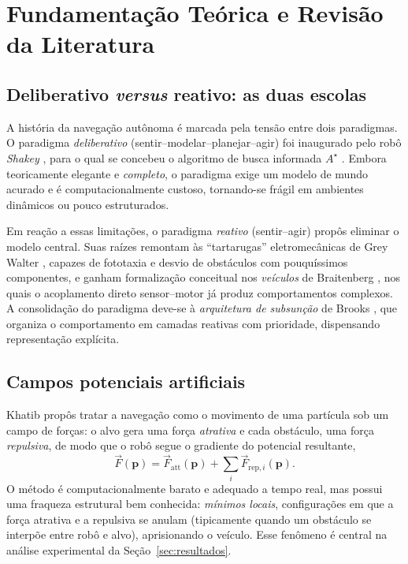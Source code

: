 \documentclass[11pt,a4paper]{article}
\begin{document}
\section{Fundamentação Teórica e Revisão da Literatura}\label{sec:fund}

\subsection{Deliberativo \emph{versus} reativo: as duas escolas}
A história da navegação autônoma é marcada pela tensão entre dois paradigmas. O paradigma \emph{deliberativo} (sentir--modelar--planejar--agir) foi inaugurado pelo robô \emph{Shakey} \cite{nilsson1984shakey}, para o qual se concebeu o algoritmo de busca informada $A^\star$ \cite{hart1968astar}. Embora teoricamente elegante e \emph{completo}, o paradigma exige um modelo de mundo acurado e é computacionalmente custoso, tornando-se frágil em ambientes dinâmicos ou pouco estruturados.

Em reação a essas limitações, o paradigma \emph{reativo} (sentir--agir) propôs eliminar o modelo central. Suas raízes remontam às ``tartarugas'' eletromecânicas de Grey Walter \cite{walter1950}, capazes de fototaxia e desvio de obstáculos com pouquíssimos componentes, e ganham formalização conceitual nos \emph{veículos} de Braitenberg \cite{braitenberg1984}, nos quais o acoplamento direto sensor--motor já produz comportamentos complexos. A consolidação do paradigma deve-se à \emph{arquitetura de subsunção} de Brooks \cite{brooks1986,brooks1991}, que organiza o comportamento em camadas reativas com prioridade, dispensando representação explícita.

\subsection{Campos potenciais artificiais}
Khatib \cite{khatib1986} propôs tratar a navegação como o movimento de uma partícula sob um campo de forças: o alvo gera uma força \emph{atrativa} e cada obstáculo, uma força \emph{repulsiva}, de modo que o robô segue o gradiente do potencial resultante,
\begin{equation}
  \vec{F}(\mathbf{p}) = \vec{F}_{\text{att}}(\mathbf{p}) + \sum_i \vec{F}_{\text{rep},i}(\mathbf{p}).
\end{equation}
O método é computacionalmente barato e adequado a tempo real, mas possui uma fraqueza estrutural bem conhecida: \emph{mínimos locais}, configurações em que a força atrativa e a repulsiva se anulam (tipicamente quando um obstáculo se interpõe entre robô e alvo), aprisionando o veículo. Esse fenômeno é central na análise experimental da Seção~\ref{sec:resultados}.
\end{document}
